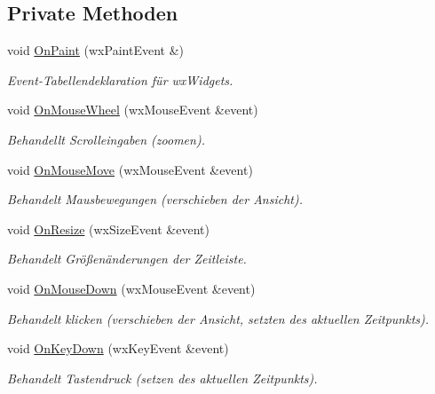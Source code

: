 \subsection*{Private Methoden}
\begin{DoxyCompactItemize}
\item 
void \hyperlink{classGUITimeline_a55f17926f5dd787c8ae118127f73ca88}{On\-Paint} (wx\-Paint\-Event \&)
\begin{DoxyCompactList}\small\item\em Event-\/\-Tabellendeklaration für wx\-Widgets. \end{DoxyCompactList}\item 
void \hyperlink{classGUITimeline_a23116af54d562cef9cb891adf2358a06}{On\-Mouse\-Wheel} (wx\-Mouse\-Event \&event)
\begin{DoxyCompactList}\small\item\em Behandellt Scrolleingaben (zoomen). \end{DoxyCompactList}\item 
void \hyperlink{classGUITimeline_a7d53538e56f4571e729dfe64a820ddf2}{On\-Mouse\-Move} (wx\-Mouse\-Event \&event)
\begin{DoxyCompactList}\small\item\em Behandelt Mausbewegungen (verschieben der Ansicht). \end{DoxyCompactList}\item 
void \hyperlink{classGUITimeline_a0cba2d830e1d9189b664cd512576be36}{On\-Resize} (wx\-Size\-Event \&event)
\begin{DoxyCompactList}\small\item\em Behandelt Größenänderungen der Zeitleiste. \end{DoxyCompactList}\item 
void \hyperlink{classGUITimeline_a7254dd9824190a6288da682d8fefad09}{On\-Mouse\-Down} (wx\-Mouse\-Event \&event)
\begin{DoxyCompactList}\small\item\em Behandelt klicken (verschieben der Ansicht, setzten des aktuellen Zeitpunkts). \end{DoxyCompactList}\item 
void \hyperlink{classGUITimeline_a82c3ff544345678870f3738443387bc0}{On\-Key\-Down} (wx\-Key\-Event \&event)
\begin{DoxyCompactList}\small\item\em Behandelt Tastendruck (setzen des aktuellen Zeitpunkts). \end{DoxyCompactList}\item 

\end{DoxyCompactItemize}
